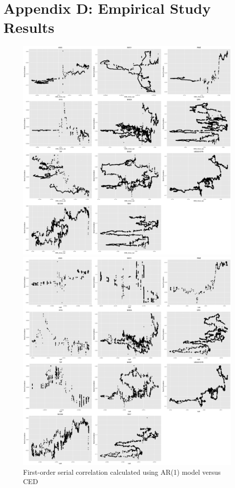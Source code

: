 \documentclass[11pt]{article}
\begin{document}
\section{Appendix D: Empirical Study Results} \label{App:AppendixD}
\begin{figure}[H]
  \centering
  \begin{minipage}[b]{0.48\textwidth}
    \includegraphics[width=\textwidth]{../results/SerCol-CED5yr3monAR1}
    \caption{First-order serial correlation calculated using AR(1) model versus CED}
    \label{fig:SerCol-CED5yr3monAR1}
  \end{minipage}
  \hfill
  \begin{minipage}[b]{0.48\textwidth}
    \includegraphics[width=\textwidth]{../results/SerCol-VaR5yrAR1}

\end{minipage}
\end{figure}
\end{document}
